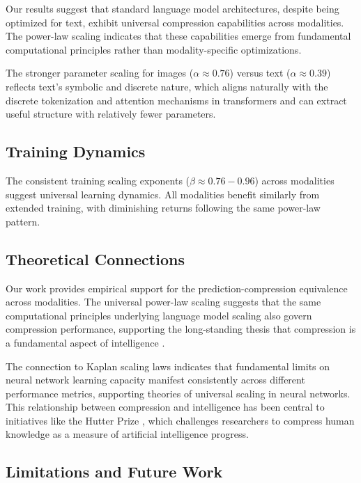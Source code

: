 \documentclass[10pt]{article} %
\begin{document}
Our results suggest that standard language model architectures, despite being optimized for text, exhibit universal compression capabilities across modalities. The power-law scaling indicates that these capabilities emerge from fundamental computational principles rather than modality-specific optimizations.

The stronger parameter scaling for images ($\alpha \approx 0.76$) versus text ($\alpha \approx 0.39$) reflects text’s symbolic and discrete nature, which aligns naturally with the discrete tokenization and attention mechanisms in transformers and can extract useful structure with relatively fewer parameters.

\subsection{Training Dynamics}

The consistent training scaling exponents ($\beta \approx 0.76-0.96$) across modalities suggest universal learning dynamics. All modalities benefit similarly from extended training, with diminishing returns following the same power-law pattern. 

\subsection{Theoretical Connections}

Our work provides empirical support for the prediction-compression equivalence across modalities. The universal power-law scaling suggests that the same computational principles underlying language model scaling also govern compression performance, supporting the long-standing thesis that compression is a fundamental aspect of intelligence \citep{legg2007universal}.

The connection to Kaplan scaling laws indicates that fundamental limits on neural network learning capacity manifest consistently across different performance metrics, supporting theories of universal scaling in neural networks. This relationship between compression and intelligence has been central to initiatives like the Hutter Prize \citep{hutter2006human}, which challenges researchers to compress human knowledge as a measure of artificial intelligence progress.

\subsection{Limitations and Future Work}
\end{document}
